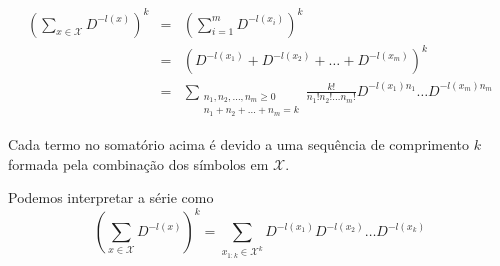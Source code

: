 \begin{frame}[allowframebreaks]
\begin{lemma}
  \begin{eqnarray}
  \left( \sum_{x \in \mathcal{X}} D^{-l(x)} \right)^k &=& \left( \sum_{i=1}^{m} D^{-l(x_i)} \right)^k \nonumber \\
		&=& \left( D^{-l(x_1)} + D^{-l(x_2)} + \ldots + D^{-l(x_m)}  \right)^k \nonumber \\
		&=& \sum_{\substack{ n_1, n_2, \ldots, n_m \geq 0 \\ n_1 + n_2 + \ldots + n_m = k}} 
			\frac{k!}{n_1! n_2! \ldots n_m!} D^{-l(x_1)n_1} \ldots D^{-l(x_m)n_m} \nonumber
  \end{eqnarray}
  \lemmabreak

  Cada termo no somatório acima é devido a uma sequência de comprimento $k$ formada pela combinação dos símbolos
  em $\mathcal{X}$. 

  Podemos interpretar a série como 
  \begin{equation}
  \left( \sum_{x \in \mathcal{X}} D^{-l(x)} \right)^k = \sum_{x_{1:k} \in \mathcal{X}^k} D^{-l(x_1)} D^{-l(x_2)} \ldots D^{-l(x_k)} 
  \end{equation}
  \end{lemma}


\end{frame}
